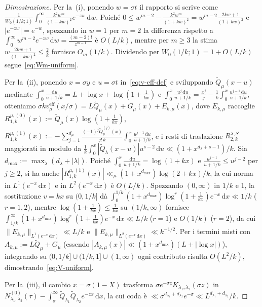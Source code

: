 \documentclass[11pt, reqno]{amsart}
\theoremstyle{remark}
\numberwithin{equation}{section}
\newcommand{\dd}{\,\mathrm{d}}
\begin{document}
\begin{proof}[Dimostrazione]
Per la~(i), ponendo $w = \sigma t$ il rapporto si scrive come
$\frac{1}{W_0(1/k;1)}\int_0^\infty \frac{k^2 w^m}{(1+kw)^2} e^{-zw}\dd w$.
Poiché $0 \le w^{m-2} - \frac{k^2 w^m}{(1+kw)^2} = w^{m-2}\frac{2kw+1}{(1+kw)^2}$ e $|e^{-zw}| = e^{-w}$,
spezzando in $w=1$ per $m=2$ la differenza rispetto a $\int_0^\infty w^{m-2}e^{-zw}\dd w = \frac{(m-2)!}{z^{m-1}}$
è $O(L/k)$, mentre per $m \ge 3$ la stima $w\frac{2kw+1}{(1+kw)^2} \le \frac{2}{k}$ fornisce $O_m(1/k)$.
Dividendo per $W_0(1/k;1) = 1 + O(L/k)$ segue~\eqref{eq:Wm-uniform}.

Per la~(ii), ponendo $x = \sigma y$ e $u = \sigma t$ in~\eqref{eq:v-eff-def} e sviluppando $\widetilde{Q}_\mu(x-u)$
mediante $\int_0^x \frac{\dd u}{u+1/k} = L + \log x + \log(1 + \frac{1}{kx})$ e
$\int_0^x \frac{u^j\dd u}{u+1/k} = \frac{x^j}{j} - \frac{1}{k}\int_0^x \frac{u^{j-1}\dd u}{u+1/k}$, otteniamo
$\sigma k v_\mu^{\mathrm{eff}}(x/\sigma) = L \widetilde{Q}_\mu(x) + G_\mu(x) + E_{k,\mu}(x)$, dove $E_{k,\mu}$
raccoglie $R_{1,k}^{\mu,(0)}(x) := \widetilde{Q}_\mu(x)\log(1 + \frac{1}{kx})$,
$R_{1,k}^{\mu,(1)}(x) := -\sum_{j=1}^{d_\mu} \frac{(-1)^j \widetilde{Q}_\mu^{(j)}(x)}{j!\, k}\int_0^x \frac{u^{j-1}\dd u}{u+1/k}$,
e i resti di traslazione $R_{2,k}^{\lambda,S}$ maggiorati in modulo da
$\frac{1}{k}\int_0^x |\widetilde{Q}_\lambda(x-u)|u^{s-2}\dd u \ll (1+x^{d_\lambda+s-1})/k$.
Sia $d_{\max} := \max_\lambda (d_\lambda + |\lambda|)$.
Poiché $\int_0^x \frac{\dd u}{u+1/k} = \log(1+kx)$ e $\frac{u^{j-1}}{u+1/k} \le u^{j-2}$ per $j \ge 2$,
si ha anche $|R_{1,k}^{\mu,(1)}(x)| \ll_\mu (1+x^{d_{\max}})\log(2+kx)/k$, la cui norma in $L^1(e^{-x}\dd x)$
e in $L^2(e^{-x}\dd x)$ è $O(L/k)$.
Spezzando $(0,\infty)$ in $1/k$ e $1$, la sostituzione
$v = kx$ su $(0, 1/k]$ dà $\int_0^{1/k} (1+x^{d_{\max}})\log^r(1+\frac{1}{kx})e^{-x}\dd x \ll 1/k$ ($r = 1,2$),
mentre $\log(1+\frac{1}{kx}) \le \frac{1}{kx}$ su $(1/k,\infty)$ fornisce
$\int_{1/k}^\infty (1+x^{d_{\max}})\log^r(1+\frac{1}{kx})e^{-x}\dd x \ll L/k$ ($r = 1$) e $O(1/k)$ ($r = 2$),
da cui $\|E_{k,\mu}\|_{L^1(e^{-x}\dd x)} \ll L/k$ e $\|E_{k,\mu}\|_{L^2(e^{-x}\dd x)} \ll k^{-1/2}$.
Per i termini misti con $A_{k,\mu} := L\widetilde{Q}_\mu + G_\mu$ (essendo
$|A_{k,\mu}(x)| \ll (1+x^{d_{\max}})(L + |\log x|)$), integrando su $(0, 1/k] \cup (1/k, 1] \cup (1,\infty)$
ogni contributo risulta $O(L^2/k)$, dimostrando~\eqref{eq:V-uniform}.

Per la~(iii), il cambio $x = \sigma(1-X)$ trasforma $\sigma e^{-\sigma z} K_{\lambda_1,\lambda_2}(\sigma z)$ in
$N_{\lambda_1,\lambda_2}^{(0)}(\tau) - \int_\sigma^\infty \widetilde{Q}_{\lambda_1}\widetilde{Q}_{\lambda_2} e^{-zx}\dd x$,
la cui coda è $\ll \sigma^{d_{\lambda_1}+d_{\lambda_2}} e^{-\sigma} \ll L^{d_{\lambda_1}+d_{\lambda_2}}/k$.
\end{proof}
\end{document}

